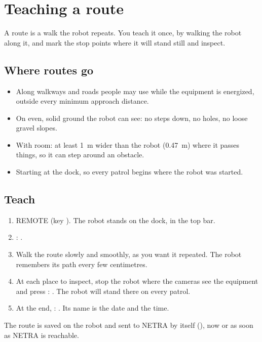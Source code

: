 \chapter{Teaching a route}
\label{ch:u-routes}

A route is a walk the robot repeats. You teach it once, by walking the robot along it, and mark
the stop points where it will stand still and inspect.

\section{Where routes go}

\begin{itemize}
  \item Along walkways and roads people may use while the equipment is energized, outside every
    minimum approach distance.
  \item On even, solid ground the robot can see: no steps down, no holes, no loose gravel slopes.
  \item With room: at least 1~m wider than the robot (0.47~m) where it passes things, so it can
    step around an obstacle.
  \item Starting at the dock, so every patrol begins where the robot was started.
\end{itemize}

\section{Teach}

\begin{enumerate}
  \item REMOTE (key ). The robot stands on the dock,  in the top bar.
  \item {}: .
  \item Walk the route slowly and smoothly, as you want it repeated. The robot remembers its path
    every few centimetres.
  \item At each place to inspect, stop the robot where the cameras see the equipment and press
    : . The robot will stand there on every patrol.
  \item At the end, : . Its name is the date and the time.
\end{enumerate}

The route is saved on the robot and sent to NETRA by itself (), now or as soon as
NETRA is reachable.

